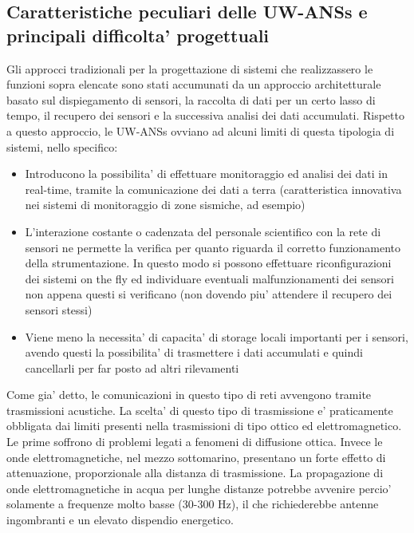 \subsection{Caratteristiche peculiari delle UW-ANSs e principali difficolta' progettuali}
Gli approcci tradizionali per la progettazione di sistemi che realizzassero le funzioni sopra elencate sono stati accumunati da un approccio architetturale basato sul dispiegamento di sensori, la raccolta di dati per un certo lasso di tempo, il recupero dei sensori e la successiva analisi dei dati accumulati.\newline
Rispetto a questo approccio, le UW-ANSs ovviano ad alcuni limiti di questa tipologia di sistemi, nello specifico: \newline
\begin{itemize}
\item Introducono la possibilita' di effettuare monitoraggio ed analisi dei dati in real-time, tramite la comunicazione dei dati a terra (caratteristica innovativa nei sistemi di monitoraggio di zone sismiche, ad esempio)\newline
\item L'interazione costante o cadenzata del personale scientifico con la rete di sensori ne permette la verifica per quanto riguarda il corretto funzionamento della strumentazione. \newline In questo modo si possono effettuare riconfigurazioni dei sistemi on the fly ed individuare eventuali malfunzionamenti dei sensori non appena questi si verificano (non dovendo piu' attendere il recupero dei sensori stessi)\newline
\item Viene meno la necessita' di capacita' di storage locali importanti per i sensori, avendo questi la possibilita' di trasmettere i dati accumulati e quindi cancellarli per far posto ad altri rilevamenti
\end{itemize}
Come gia' detto, le comunicazioni in questo tipo di reti avvengono tramite trasmissioni acustiche. La scelta' di questo tipo di trasmissione e' praticamente obbligata dai limiti presenti nella trasmissioni di tipo ottico ed elettromagnetico. \newline Le prime soffrono di problemi legati a fenomeni di diffusione ottica. \newline Invece le onde elettromagnetiche, nel mezzo sottomarino, presentano un forte effetto di attenuazione, proporzionale alla distanza di trasmissione. \newline La propagazione di onde elettromagnetiche in acqua per lunghe distanze potrebbe avvenire percio' solamente a frequenze molto basse (30-300 Hz), il che richiederebbe antenne ingombranti e un elevato dispendio energetico.\newline

